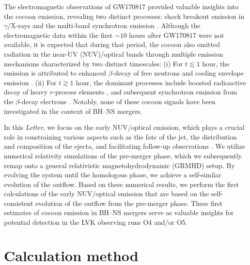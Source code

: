 \documentclass[twocolumn,dvipsnames]{aastex62}
\begin{document}
The electromagnetic observations of GW170817 provided valuable insights into the cocoon emission, revealing two distinct processes: shock breakout emission in $\gamma$/X-rays \citep{Kasliwal2017,Gottlieb2018b} and the multi-band synchrotron emission \citep[e.g.,][]{Lazzati2018,Mooley2018a,Mooley2018b}. Although the electromagnetic data within the first $ \sim 10 $ hours after GW170817 were not available, it is expected that during that period, the cocoon also emitted radiation in the near-UV (NUV)/optical bands through multiple emission mechanisms characterized by two distinct timescales:
(i) For $t \lesssim 1$ hour, the emission is attributed to enhanced $ \beta $-decay of free neutrons \citep{Gottlieb2020c} and cooling envelope emission \citep[][]{Metzger2015,Kasliwal2017,Nakar2017,Gottlieb2018a,Piro2018}.
(ii) For $t \gtrsim 1$ hour, the dominant processes include boosted radioactive decay of heavy $r$-process elements \citep[kilonova;][]{Metzger2015,Kasliwal2017,Nakar2017,Gottlieb2018a,Piro2018,Hamidani2022}, and subsequent synchrotron emission from the $ \beta $-decay electrons \citep{Gottlieb2020c}.
Notably, none of these cocoon signals have been investigated in the context of BH--NS mergers.

In this {\it Letter}, we focus on the early NUV/optical emission, which plays a crucial role in constraining various aspects such as the fate of the jet, the distribution and composition of the ejecta, and facilitating follow-up observations \citep[however, the multiple predictions cause difficulties in discriminating the potential signals; see][]{Arcavi2018,Gottlieb2020c}. We utilize numerical relativity simulations of the pre-merger phase, which we subsequently remap onto a general relativistic magnetohydrodynamic (GRMHD) setup. By evolving the system until the homologous phase, we achieve a self-similar evolution of the outflow. Based on these numerical results, we perform the first calculations of the early NUV/optical emission that are based on the self-consistent evolution of the outflow from the pre-merger phase. These first estimates of cocoon emission in BH--NS mergers serve as valuable insights for potential detection in the LVK observing runs O4 and/or O5.

\section{Calculation method}\label{sec:setup}
\end{document}
